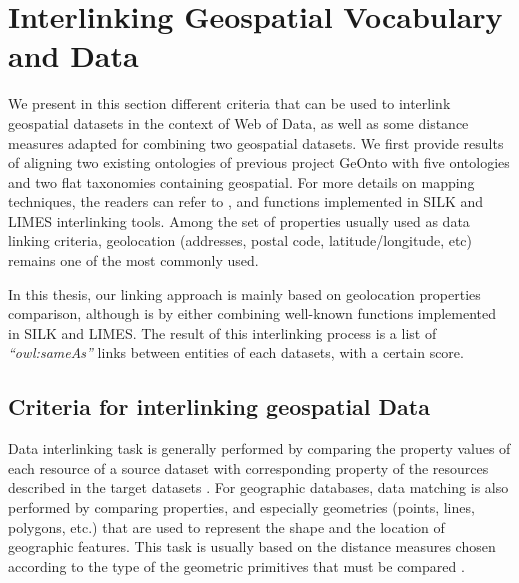 \section{Interlinking Geospatial Vocabulary and Data}
\label{sec:interlinking}
We present in this section different criteria that can be used to interlink geospatial datasets in the context of Web of Data, as well as some distance measures adapted for combining two geospatial datasets. We first provide results of aligning two existing ontologies of previous project GeOnto with five ontologies and two flat taxonomies containing geospatial. For more details on mapping techniques, the readers can refer to \cite{euzenat2007}, and functions implemented in SILK \cite{jentzsch2010silk,isele2011} and LIMES \cite{ngau11} interlinking tools. Among the set of properties usually used as data linking criteria, geolocation (addresses, postal code, latitude/longitude, etc) remains one of the most commonly used.

In this thesis, our linking approach is mainly based on geolocation properties comparison, although is by either combining well-known functions implemented in SILK and LIMES. The result of this interlinking process is a list of \textit{``owl:sameAs''} links between entities of each datasets, with a certain score.

\subsection{Criteria for interlinking geospatial Data}
Data interlinking task is generally performed by comparing the property values of each resource of a source dataset with corresponding property of the resources described in the target datasets \cite{scharffe2010}. For geographic databases, data matching is also performed by comparing properties, and especially geometries (points, lines, polygons, etc.) that are used to represent the shape and the location of geographic features. This task is usually based on the distance measures chosen according to the type of the geometric primitives that must be compared \cite{mustiere2008,anamaria08,Julius09,walter1999}.

